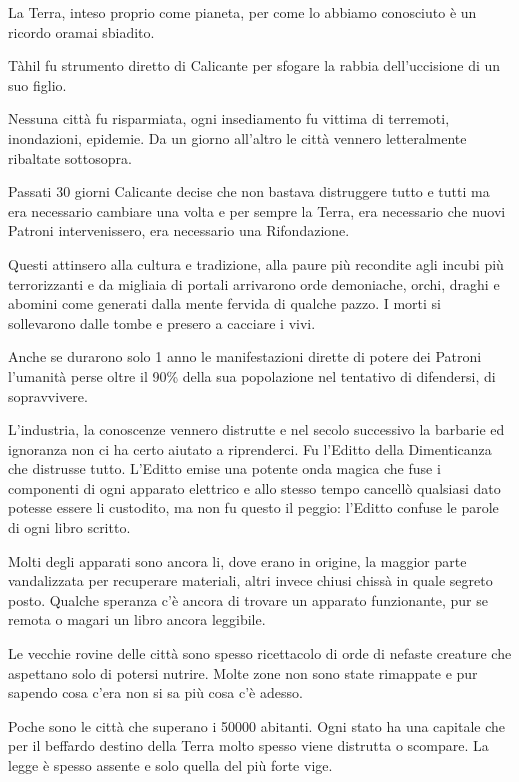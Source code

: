 \begin{multicols}{2}

\label{terra}

La Terra, inteso proprio come pianeta, per come lo abbiamo conosciuto è un ricordo oramai sbiadito.

Tàhil fu strumento diretto di Calicante per sfogare la rabbia dell'uccisione di un suo figlio.

Nessuna città fu risparmiata, ogni insediamento fu vittima di terremoti, inondazioni, epidemie. Da un giorno all'altro le città vennero letteralmente ribaltate sottosopra. 

Passati 30 giorni Calicante decise che non bastava distruggere tutto e tutti ma era necessario cambiare una volta e per sempre la Terra, era necessario che nuovi Patroni intervenissero, era necessario una Rifondazione.

Questi attinsero alla cultura e tradizione, alla paure più recondite agli incubi più terrorizzanti e da migliaia di portali arrivarono orde demoniache, orchi, draghi e abomini come generati dalla mente fervida di qualche pazzo. I morti si sollevarono dalle tombe e presero a cacciare i vivi.

Anche se durarono solo 1 anno le manifestazioni dirette di potere dei Patroni l'umanità perse oltre il 90\% della sua popolazione nel tentativo di difendersi, di sopravvivere.

L'industria, la conoscenze vennero distrutte e nel secolo successivo la barbarie ed ignoranza non ci ha certo aiutato a riprenderci. 
Fu l'Editto della Dimenticanza che distrusse tutto. L'Editto emise una potente onda magica che fuse i componenti di ogni apparato elettrico e allo stesso tempo cancellò qualsiasi dato potesse essere li custodito, ma non fu questo il peggio: l'Editto confuse le parole di ogni libro scritto.

Molti degli apparati sono ancora li, dove erano in origine, la maggior parte vandalizzata per recuperare materiali, altri invece chiusi chissà in quale segreto posto. Qualche speranza c'è ancora di trovare un apparato funzionante, pur se remota o magari un libro ancora leggibile.

Le vecchie rovine delle città sono spesso ricettacolo di orde di nefaste creature che aspettano solo di potersi nutrire. Molte zone non sono state rimappate e pur sapendo cosa c'era non si sa più cosa c'è adesso.

Poche sono le città che superano i 50000 abitanti. Ogni stato ha una capitale che per il beffardo destino della Terra molto spesso viene distrutta o scompare. La legge è spesso assente e solo quella del più forte vige.


\end{multicols}
